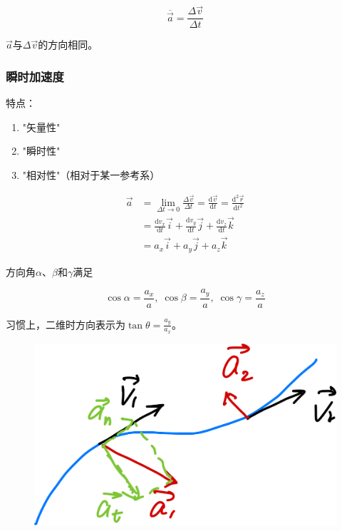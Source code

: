 \documentclass[12pt, a4paper]{article}
\newcommand{\rmd}{\mathrm{d}}
\begin{document}
    \[
    \overline{\overrightarrow{a}} = \frac{\Delta \overrightarrow{v}}{\Delta t}
    \]

    \(\overrightarrow{a}\)与\(\Delta \overrightarrow{v}\)的方向相同。

\subsubsection{瞬时加速度}

    特点：

    \begin{enumerate}
        \item {\color{Thistle}"矢量性"}
        \item {\color{Thistle}"瞬时性"}
        \item {\color{Thistle}"相对性"}（相对于某一参考系）
    \end{enumerate}

    \begin{align*}
        \overrightarrow{a} &= \lim_{\Delta t \rightarrow 0} \frac{\Delta \overrightarrow{v}}{\Delta t}
        = \frac{\rmd \overrightarrow{v}}{\rmd t} =
        \frac{\rmd^2 \overrightarrow{r}}{\rmd t^2}
        \\
        &= \frac{\rmd v_{x}}{\rmd t} \overrightarrow{i} +
        \frac{\rmd v_{y}}{\rmd t} \overrightarrow{j} +
        \frac{\rmd v_{z}}{\rmd t} \overrightarrow{k}
        \\
        &= a_{x}\overrightarrow{i} + a_{y}\overrightarrow{j}
        + a_{z}\overrightarrow{k}
    \end{align*}

    方向角\(\alpha\)、\(\beta\)和\(\gamma\)满足

    \[
        \cos \alpha = \frac{a_x}{a},\; \cos \beta = \frac{a_y}{a}, \;\cos \gamma = \frac{a_z}{a}
    \]

    习惯上，二维时方向表示为\(\tan \theta = \frac{a_y}{a_x}\)。
    
    \begin{figure}
        \centering
        \includegraphics[scale=0.05]{"Chapter 01 images/pic7.png"}
        \label{pic7}
    \end{figure}
\end{document}
